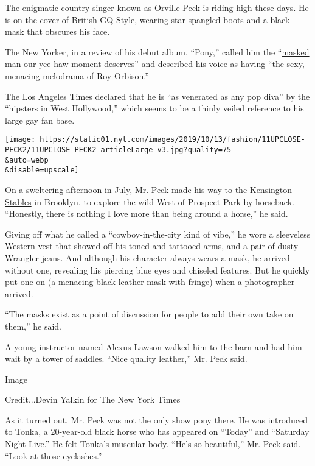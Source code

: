 The enigmatic country singer known as Orville Peck is riding high these
days. He is on the cover of
\href{https://www.gq-magazine.co.uk/culture/article/orville-peck-interview}{British
GQ Style}, wearing star-spangled boots and a black mask that obscures
his face.

The New Yorker, in a review of his debut album, ``Pony,'' called him the
``\href{https://www.newyorker.com/recommends/listen/orville-peck-the-masked-man-our-yee-haw-moment-deserves}{masked
man our yee-haw moment deserves}'' and described his voice as having
``the sexy, menacing melodrama of Roy Orbison.''

The
\href{https://www.latimes.com/entertainment-arts/music/story/2019-09-04/orville-peck-country-gay-mask-singer}{Los
Angeles Times} declared that he is ``as venerated as any pop diva'' by
the ``hipsters in West Hollywood,'' which seems to be a thinly veiled
reference to his large gay fan base.

\texttt{[image: https://static01.nyt.com/images/2019/10/13/fashion/11UPCLOSE-PECK2/11UPCLOSE-PECK2-articleLarge-v3.jpg?quality=75\\\&auto=webp\\\&disable=upscale]}

On a sweltering afternoon in July, Mr. Peck made his way to the
\href{http://kensingtonstables.com}{Kensington Stables} in Brooklyn, to
explore the wild West of Prospect Park by horseback. ``Honestly, there
is nothing I love more than being around a horse,'' he said.

Giving off what he called a ``cowboy-in-the-city kind of vibe,'' he wore
a sleeveless Western vest that showed off his toned and tattooed arms,
and a pair of dusty Wrangler jeans. And although his character always
wears a mask, he arrived without one, revealing his piercing blue eyes
and chiseled features. But he quickly put one on (a menacing black
leather mask with fringe) when a photographer arrived.

``The masks exist as a point of discussion for people to add their own
take on them,'' he said.

A young instructor named Alexus Lawson walked him to the barn and had
him wait by a tower of saddles. ``Nice quality leather,'' Mr. Peck said.

Image

Credit...Devin Yalkin for The New York Times

As it turned out, Mr. Peck was not the only show pony there. He was
introduced to Tonka, a 20-year-old black horse who has appeared on
``Today'' and ``Saturday Night Live.'' He felt Tonka's muscular body.
``He's so beautiful,'' Mr. Peck said. ``Look at those eyelashes.''

